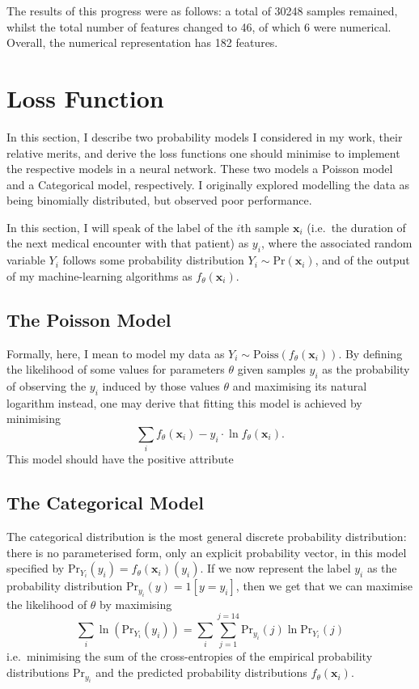 \documentclass[10pt, twoside, a4paper]{article}
\begin{document}
	The results of this progress were as follows: a total of 30248 samples remained, whilst 
	the total number of features changed to 46, of which 6 were numerical. Overall, the 
	numerical representation has 182 features.

	\section{Loss Function}

	In this section, I describe two probability models I considered in my work, their 
	relative merits, and derive the loss functions one should minimise to implement the 
	respective models in a neural network. These two models a Poisson model 
	and a Categorical model, respectively. I originally explored modelling the data as being 
	binomially distributed, but observed poor performance.
	
	In this section, I will speak of the label of the $i$th sample $\mathbf{x}_i$ (i.e.\ the 
	duration of the next medical encounter with that patient) as $y_i$, where the associated 
	random variable $Y_i$ follows some probability distribution $Y_i \sim 
	\mathrm{Pr}(\mathbf{x}_i)$, and of the output of my machine-learning algorithms as
	$f_\theta(\mathbf{x}_i)$.

	\subsection{The Poisson Model}
	Formally, here, I mean to model my data as $Y_i \sim \mathrm{Poiss}(f_\theta(\mathbf{x}_i))$.
	By defining the likelihood of some values for parameters $\theta$ given samples $y_i$ as the probability of observing the $y_i$ induced by those values $\theta$ and maximising its natural logarithm instead, one may derive that fitting this model is achieved by minimising
	$$
		\sum_i f_\theta(\mathbf x_i) - y_i \cdot \ln f_\theta(\mathbf x_i).
	$$
	This model should have the positive attribute 

	\subsection{The Categorical Model}
	The categorical distribution is the most general discrete probability distribution: there 
	is no parameterised form, only an explicit probability vector, in this model specified by 
	$\mathrm{Pr}_{Y_i}(y_i) = f_\theta(\mathbf x_i)(y_i)$. If we now represent the label $y_i$
	as the probability distribution $\mathrm{Pr}_{y_i}(y) = 1[y = y_i]$, then we get that we can 
	maximise the likelihood of $\theta$ by maximising 
	$$
		\sum_i \ln\left(\mathrm{Pr}_{Y_i}(y_i)\right) = \sum_i \sum_{j = 1}^{j=14}
		\mathrm{Pr}_{y_i}(j) \ln\mathrm{Pr}_{Y_i}(j)
	$$
	i.e.\ minimising the sum of the cross-entropies of the empirical probability distributions 
	$\mathrm{Pr}_{y_i}$ and the predicted probability distributions $f_\theta(\mathbf x_i)$.
\end{document}
